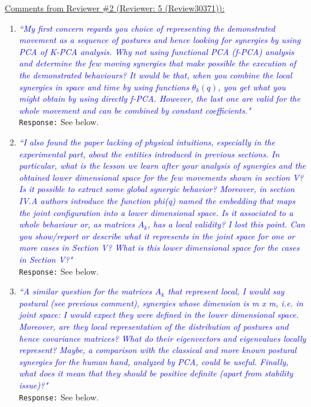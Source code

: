\documentclass{article}
\begin{document}
\underline{Comments from Reviewer \#2 (Reviewer: 5 (Review30371)):}
\begin{enumerate}
\item \textcolor{blue}{\textit{``My first concern regards you choice of representing the demonstrated
movement as a sequence of postures and hence looking for synergies by
using PCA of K-PCA analysis. Why not using functional PCA (f-PCA)
analysis and determine the few moving synergies that make possible the
execution of the demonstrated behaviours? It would be that, when you
combine the local synergies in space and time by using functions
$\theta_k(q)$, you get what you might obtain by using directly f-PCA.
However, the last one are valid for the whole movement and can be
combined by constant coefficients."}}\\
\texttt{Response:}  See below.

\item \textcolor{blue}{\textit{``I also found the paper lacking of physical intuitions, especially in	the experimental part, about the entities introduced in previous sections. In particular, what is the lesson we learn after your analysis of synergies and the obtained lower dimensional space for the few movements shown in section V? Is it possible to extract some global	synergic behavior? Moreover, in section IV.A authors introduce the function phi(q) named the embedding that maps the joint configuration into a lower dimensional space. Is it associated to a whole behaviour or, as matrices $A_k$, has a local validity? I lost this point. Can you show/report or describe what it represents in the joint space for one or more cases in Section V? What is this lower dimensional space for the cases in Section V?"}}\\
\texttt{Response:}  See below.		

\item \textcolor{blue}{\textit{``A similar question for the matrices $A_k$ that represent local, I
	would say postural (see previous comment), synergies whose dimension is
	m x m, i.e. in joint space: I would expect they were defined in the
	lower dimensional space. Moreover, are they local representation of the
	distribution of postures and hence covariance matrices? What do their
	eigenvectors and eigenvalues locally represent? Maybe, a comparison
	with the classical and more known postural synergies for the human
	hand, analyzed by PCA, could be useful. Finally, what does it mean that
	they should be positive definite (apart from stability issue)?"}}\\
\texttt{Response:}  See below.\\


\end{enumerate}
\end{document}
